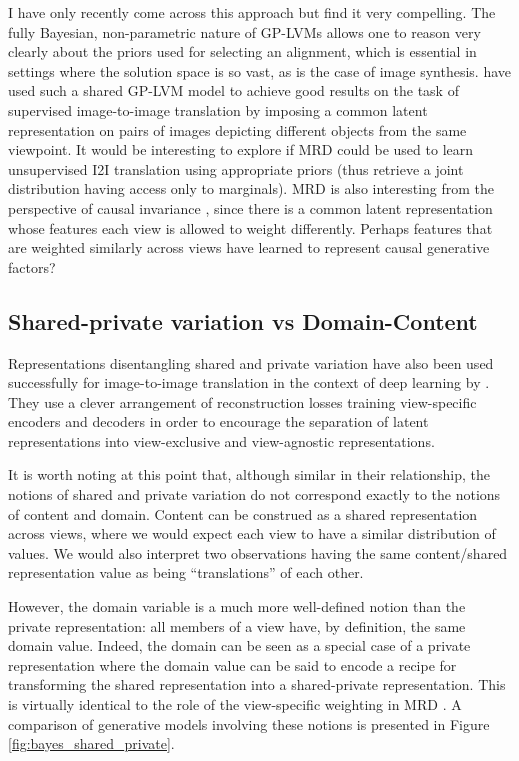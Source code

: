 \documentclass[withindex,glossary,firstyr,times]{cam-thesis}
\begin{document}
I have only recently come across this approach but find it very compelling. The fully Bayesian, non-parametric nature of GP-LVMs allows one to reason very clearly about the priors used for selecting an alignment, which is essential in settings where the solution space is so vast, as is the case of image synthesis. \citet{shon2006learning} have used such a shared GP-LVM model to achieve good results on the task of supervised image-to-image translation by imposing a common latent representation on pairs of images depicting different objects from the same viewpoint. It would be interesting to explore if MRD could be used to learn unsupervised I2I translation using appropriate priors (thus retrieve a joint distribution having access only to marginals). MRD is also interesting from the perspective of causal invariance \cite{peters2016causal, arjovsky2019invariant}, since there is a common latent representation whose features each view is allowed to weight differently. Perhaps features that are weighted similarly across views have learned to represent causal generative factors?

\subsection{Shared-private variation vs Domain-Content}
Representations disentangling shared and private variation have also been used successfully for image-to-image translation in the context of deep learning by \citet{gonzalez2018image}. They use a clever arrangement of reconstruction losses training view-specific encoders and decoders in order to encourage the separation of latent representations into view-exclusive and view-agnostic representations.

It is worth noting at this point that, although similar in their relationship, the notions of shared and private variation do not correspond exactly to the notions of content and domain. Content can be construed as a shared representation across views, where we would expect each view to have a similar distribution of values. We would also interpret two observations having the same content/shared representation value as being ``translations'' of each other.

However, the domain variable is a much more well-defined notion than the private representation: all members of a view have, by definition, the same domain value. Indeed, the domain can be seen as a special case of a private representation where the domain value can be said to encode a recipe for transforming the shared representation into a shared-private representation. This is virtually identical to the role of the view-specific weighting in MRD \cite{damianou2016multi}. A comparison of generative models involving these notions is presented in Figure \ref{fig:bayes_shared_private}.
\end{document}
